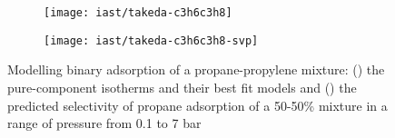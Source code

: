 \begin{figure}[htb]

    \centering
    \begin{subfigure}[b]{.42\textwidth}
        \texttt{[image: iast/takeda-c3h6c3h8]}
        \caption{}%
        \label{pyg:fig:takedac3h6c3h8iso}
    \end{subfigure}
    \begin{subfigure}[b]{.4\textwidth}
        \texttt{[image: iast/takeda-c3h6c3h8-svp]}
        \caption{}%
        \label{pyg:fig:takedac3h6c3h8iast}
    \end{subfigure}
    \caption{%
    Modelling binary adsorption of a propane-propylene mixture: 
    (\protect{}) the pure-component
    isotherms and their best fit models and 
    (\protect{})
    the predicted selectivity of propane adsorption 
    of a 50-50\% mixture in a range of pressure from 0.1 to 7 bar}%
    \label{pyg:fig:takedac3h6c3h8}

\end{figure}